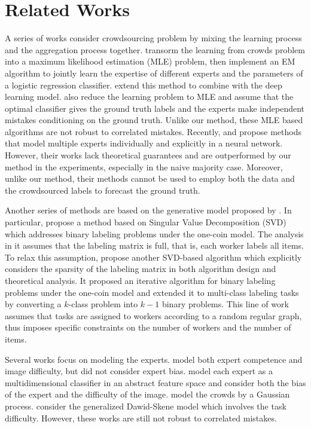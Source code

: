 \documentclass{article}
\begin{document}
\section{Related Works}

A series of works consider crowdsourcing problem by mixing the learning process and the aggregation process together. \cite{karger2014budget} transorm the learning from crowds problem into a maximum likelihood estimation (MLE) problem, then implement an EM algorithm to jointly learn the expertise of different experts and the parameters of a logistic regression classifier. \cite{albarqouni2016aggnet} extend this method to combine with the deep learning model. \cite{khetan2017learning} also reduce the learning problem to MLE and assume that the optimal classifier gives the ground truth labels and the experts make independent mistakes conditioning on the ground truth. Unlike our method, these MLE based algorithms are not robust to correlated mistakes. Recently, \cite{guan2018said} and \cite{rodrigues2018deep} propose methods that model multiple experts individually and explicitly in a neural network. However, their works lack theoretical guarantees and are outperformed by our method in the experiments, especially in the naive majority case. Moreover, unlike our method, their methods cannot be used to employ both the data and the crowdsourced labels to forecast the ground truth. 

Another series of methods are based on the generative model proposed by \cite{dawid1979maximum}. In particular, \cite{ghosh2011moderates} propose a method based on Singular Value Decomposition (SVD) which addresses binary labeling problems under the one-coin model. The analysis in it assumes that the labeling matrix is full, that is, each worker labels all items. To relax this assumption, \cite{dalvi2013aggregating} propose another SVD-based algorithm which explicitly considers the sparsity of the labeling matrix in both algorithm design and theoretical analysis. It proposed an iterative algorithm for binary labeling problems under the one-coin model  and extended it to multi-class labeling tasks by converting a $k$-class problem into $k-1$ binary problems. This line of work assumes that tasks are assigned to workers according to a random regular graph, thus imposes specific constraints on the number of workers and the number of items. 

Several works focus on modeling the experts. \cite{whitehill2009whose} model both expert competence and image difficulty, but did not consider expert bias.
\cite{welinder2010multidimensional} model each expert as a multidimensional classifier in an abstract feature space and consider both the bias of the expert and the difficulty of the image. \cite{rodrigues2014gaussian} model the crowds by a Gaussian process. \cite{shah2016permutation} consider the generalized Dawid-Skene model \cite{dawid1979maximum} which involves the task difficulty. However, these works are still not robust to correlated mistakes.
\end{document}
